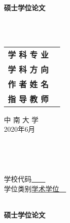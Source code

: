 \linespread{1.56}\selectfont%
\begin{titlepage}
	\thispagestyle{empty}
	
	\begin{center}
		\vspace*{6em}
		{\heiti {} \bfseries 硕士学位论文}\par
		\vspace{3.5em}
		{\heiti {}\bfseries \mytitle}\\
		\vspace{2em}
		{\bfseries\myEnlishTitle}\\
		\vspace{6em}
		{
			\begin{tabular}{>{\songti}r >{\songti}l}			
				\bfseries 学 科 专 业\quad               &\bfseries \major  \\[19pt]
				\bfseries 学 科 方 向\quad               &\bfseries \discipline  \\[19pt]
				\bfseries 作 者 姓 名\quad     &\bfseries \myName  \\ [19pt]
				\bfseries 指 导 教 师\quad               &\bfseries \mySupervisor\\ [19pt]
			\end{tabular}
		}
		
		\vspace{5em}
		{\songti {} 中 南 大 学\\ 2020年6月}	
	\end{center}
\end{titlepage}
\newpage \thispagestyle{empty}~
\newpage \thispagestyle{empty}
\begin{center}
	\newlength{\ztfl}
	\begin{minipage}[t]{\ztfl}
		{\songti {} \uline{\makebox[5em][c]{\zhongtu}}}\\
		{ \uline{\makebox[5em][c]{\UDC}}}
	\end{minipage}\hfill
	\newlength{\SchoolCodeLength}
	\begin{minipage}[t]{\SchoolCodeLength}
		{\songti 学校代码\uline{~~~~\quad}}\\
		{\songti 学位类别\uline{\quad 学术学位~~}}
	\end{minipage}
	\vspace{5em}\\
	{\heiti {}\bfseries 硕士学位论文}\par
	\vspace{2em}
	{\heiti {}\bfseries \mytitle}\\
	\vspace{1em}
	{\bfseries\myEnlishTitle}
	\vspace{3em}
\end{center}
